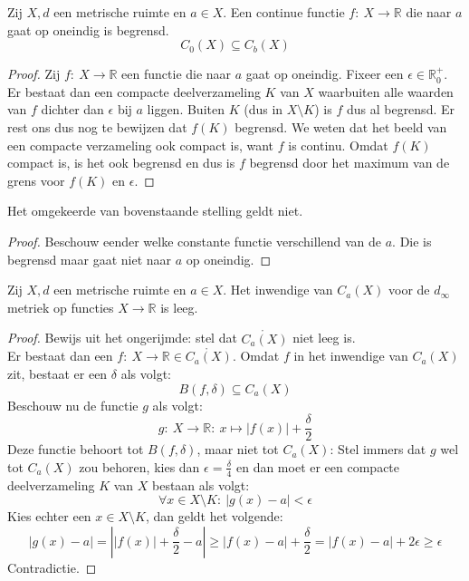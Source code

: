 \documentclass[main.tex]{subfiles}
\begin{document}
\begin{st}
  \label{st:continu-naar-a-op-oneindig-dan-begrensd}
  Zij $X,d$ een metrische ruimte en $a\in X$.
  Een continue functie $f:\ X \rightarrow \mathbb{R}$ die naar $a$ gaat op oneindig is begrensd.
  \[ C_{0}(X) \subseteq C_{b}(X) \]

  \begin{proof}
    Zij $f:\ X \rightarrow\mathbb{R}$ een functie die naar $a$ gaat op oneindig.
    Fixeer een $\epsilon \in\mathbb{R}_{0}^{+}$.
    Er bestaat dan een compacte deelverzameling $K$ van $X$ waarbuiten alle waarden van $f$ dichter dan $\epsilon$ bij $a$ liggen.
    Buiten $K$ (dus in $X\setminus K$) is $f$ dus al begrensd.
    Er rest ons dus nog te bewijzen dat $f(K)$ begrensd.
    We weten dat het beeld van een compacte verzameling ook compact is, want $f$ is continu.
    Omdat $f(K)$ compact is, is het ook begrensd en dus is $f$ begrensd door het maximum van de grens voor $f(K)$ en $\epsilon$.
  \end{proof}
\end{st}

\begin{tvb}
  Het omgekeerde van bovenstaande stelling geldt niet.

  \begin{proof}
    Beschouw eender welke constante functie verschillend van de $a$.
    Die is begrensd maar gaat niet naar $a$ op oneindig.
  \end{proof}
\end{tvb}

\begin{st}
  Zij $X,d$ een metrische ruimte en $a\in X$.
  Het inwendige van $C_{a}(X)$ voor de $d_{\infty}$ metriek op functies $X\rightarrow \mathbb{R}$ is leeg.

  \begin{proof}
    Bewijs uit het ongerijmde: stel dat $\mathring{C_{a}(X)}$ niet leeg is.\\
    Er bestaat dan een $f:\ X \rightarrow \mathbb{R} \in \mathring{C_{a}(X)}$.
    Omdat $f$ in het inwendige van $C_{a}(X)$ zit, bestaat er een $\delta$ als volgt:
    \[ B(f,\delta) \subseteq C_{a}(X) \]
    Beschouw nu de functie $g$ als volgt:
    \[ g:\ X \rightarrow \mathbb{R}:\ x \mapsto |f(x)| + \frac{\delta}{2} \]
    Deze functie behoort tot $B(f,\delta)$, maar niet tot $C_{a}(X)$:
    Stel immers dat $g$ wel tot $C_{a}(X)$ zou behoren, kies dan $\epsilon = \frac{\delta}{4}$ en dan moet er een compacte deelverzameling $K$ van $X$ bestaan als volgt:
    \[ \forall x\in X\setminus K:\ |g(x)-a| < \epsilon \]
    Kies echter een $x\in X\setminus K$, dan geldt het volgende:
    \[ |g(x)-a| = \left||f(x)| + \frac{\delta}{2} - a\right| \ge |f(x)-a| + \frac{\delta}{2} = |f(x)-a| + 2\epsilon \ge \epsilon \]
    Contradictie.
  \end{proof}
\end{st}
\end{document}

